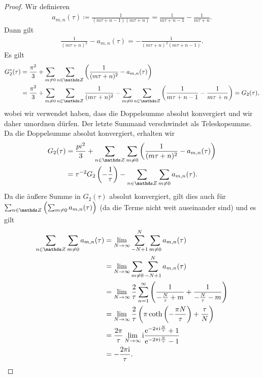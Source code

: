 \begin{proof}
Wir definieren
\begin{align*}
a_{m,n}(\tau)\coloneqq\frac{1}{(m\tau+n-1)(m\tau+n)}=\frac{1}{m\tau +n-1}-\frac{1}{m\tau +n}.
\end{align*}
Dann gilt
\begin{align*}
\frac{1}{(m\tau+n)^2}-a_{m,n}(\tau)=-\frac{1}{(m\tau+n)^2(m\tau+n-1)}.
\end{align*}
Es gilt
\begin{align*}
G_2^\ast(\tau)&=\frac{\pi^2}{3}+\sum_{m\not=0} \sum_{n\in \Z} \left(\frac{1}{(m\tau+n)^2}-a_{m,n}(\tau)\right)\\
&=\frac{\pi^2}{3}+\sum_{m\not=0} \sum_{n\in \Z} \frac{1}{(m\tau+n)^2}-\sum_{m\not=0}\sum_{n\in \Z} \left(\frac{1}{m\tau+n-1}-\frac{1}{m\tau +n}\right)=G_2(\tau),
\end{align*}
wobei wir verwendet haben, dass die Doppelsumme absolut konvergiert
und wir daher umordnen dürfen.
Der letzte Summand verschwindet als Teleskopsumme.
Da die Doppelsumme absolut konvergiert, erhalten wir
\begin{align*}
G_2(\tau)&= \frac{pi^2}{3}+\sum_{n\in \Z} \sum_{m\not =0} \left(\frac{1}{(m\tau +n)^2}-a_{m,n}(\tau)\right)\\
&=\tau^{-2} G_2\left(-\frac{1}{\tau}\right)- \sum_{n \in \Z} \sum_{m \not =0} a_{m,n}(\tau).
\end{align*}
Da die äußere Summe in $G_2(\tau)$ absolut konvergiert, gilt dies auch für $\sum_{n \in \Z}\left( \sum_{m\not =0} a_{m,n}(\tau)\right)$ (da die Terme \glqq nicht weit auseinander sind\grqq) und es gilt
\begin{align*}
\sum_{n\in \Z} \sum_{m \not=0} a_{m,n}(\tau)
&=\lim_{N\to \infty} \sum_{-N+1}^N \sum_{m\not =0} a_{m,n}(\tau)\\
&=\lim_{N \to \infty} \sum_{m\not =0} \sum_{-N+1}^N a_{m,n}(\tau)\\
&=\lim_{N \to \infty} \frac{2}{\tau} \sum_{n=1}^\infty \left(\frac{1}{-\frac{N}{\tau}+m}+ \frac{1}{-\frac{N}{\tau}-m}\right)\\
&=\lim_{N\to \infty} \frac{2}{\tau} \left(\pi \coth\left(-\frac{\pi N}{\tau}\right) +\frac{\tau}{N}\right)\\
&=\frac{2\pi}{\tau} \lim_{N\to \infty} \mathrm{i} \frac{\ex^{-2\pi \mathrm{i}\frac{N}{\tau}}+1}{\ex^{-2\pi \mathrm{i}\frac{N}{\tau}}-1}\\
&=-\frac{2\pi \mathrm{i}}{\tau}.
\end{align*}
\end{proof}

